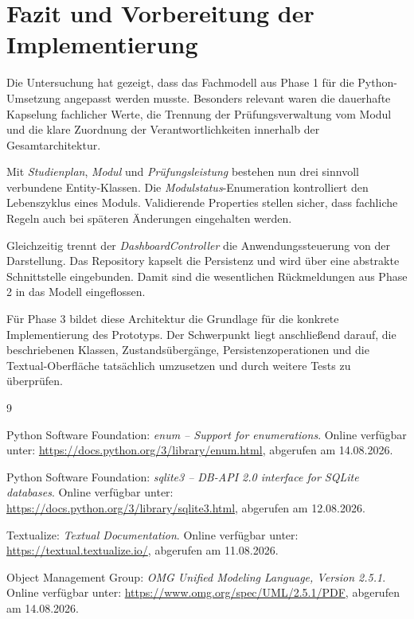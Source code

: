 \documentclass[11pt,a4paper]{article}
\begin{document}
\newpage
\section{Fazit und Vorbereitung der Implementierung}

Die Untersuchung hat gezeigt, dass das Fachmodell aus Phase 1 für die
Python-Umsetzung angepasst werden musste. Besonders relevant waren
die dauerhafte Kapselung fachlicher Werte, die Trennung der
Prüfungsverwaltung vom Modul und die klare Zuordnung der
Verantwortlichkeiten innerhalb der Gesamtarchitektur.

Mit
\textit{Studienplan},
\textit{Modul} und
\textit{Prüfungsleistung}
bestehen nun drei sinnvoll verbundene Entity-Klassen. Die
\textit{Modulstatus}-Enumeration kontrolliert den Lebenszyklus eines
Moduls. Validierende Properties stellen sicher, dass fachliche Regeln
auch bei späteren Änderungen eingehalten werden.

Gleichzeitig trennt der \textit{DashboardController} die
Anwendungssteuerung von der Darstellung. Das Repository kapselt die
Persistenz und wird über eine abstrakte Schnittstelle eingebunden.
Damit sind die wesentlichen Rückmeldungen aus Phase 2 in das Modell
eingeflossen.

Für Phase 3 bildet diese Architektur die Grundlage für die konkrete
Implementierung des Prototyps. Der Schwerpunkt liegt anschließend
darauf, die beschriebenen Klassen, Zustandsübergänge,
Persistenzoperationen und die Textual-Oberfläche tatsächlich
umzusetzen und durch weitere Tests zu überprüfen.

\renewcommand{\refname}{Literatur- und Quellenverzeichnis}

\begin{thebibliography}{9}
\scriptsize

Python Software Foundation:
\textit{enum -- Support for enumerations}.
Online verfügbar unter:
\url{https://docs.python.org/3/library/enum.html},
abgerufen am 14.08.2026.

Python Software Foundation:
\textit{sqlite3 -- DB-API 2.0 interface for SQLite databases}.
Online verfügbar unter:
\url{https://docs.python.org/3/library/sqlite3.html},
abgerufen am 12.08.2026.

Textualize:
\textit{Textual Documentation}.
Online verfügbar unter:
\url{https://textual.textualize.io/},
abgerufen am 11.08.2026.

Object Management Group:
\textit{OMG Unified Modeling Language, Version 2.5.1}.
Online verfügbar unter:
\url{https://www.omg.org/spec/UML/2.5.1/PDF},
abgerufen am 14.08.2026.

\end{thebibliography}
\end{document}
